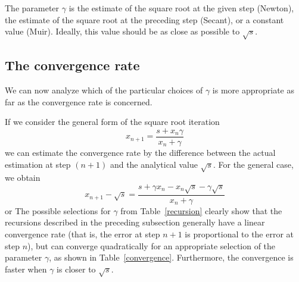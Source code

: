 \begin {enumerate}
The parameter $\gamma$ is the estimate of the square root at the given
step (Newton), the estimate of the square root at the preceding step
(Secant), or a constant value (Muir). Ideally, this value should be as
close as possible to $\sqrt{s}$.
\end{enumerate}

\subsection{The convergence rate}
We can now analyze which of the particular choices of $\gamma$ is more
appropriate as far as the convergence rate is concerned.
\par
If we consider the general form of the square root iteration
\[x_{n+1}=\frac{s+x_{n}\gamma}{x_n+\gamma}\]
we can estimate the convergence rate by the difference between the
actual estimation at step $(n+1)$ and the analytical value
$\sqrt{s}$. For the general case, we obtain
\[ x_{n+1}-\sqrt{s} =
\frac{s+\gamma x_n -x_n \sqrt{s}-\gamma \sqrt{s}}{x_n+\gamma}\]
or
\beq \label{convergence}
 \eeq
The possible selections for $\gamma$ from Table~\ref{recursion} 
clearly show that the recursions
described in the preceding subsection generally have a linear
convergence rate (that is, the error at step $n+1$ is proportional to
the error at step $n$), but can converge quadratically for an
appropriate selection of the parameter $\gamma$, as shown in 
Table~\ref{convergence}. Furthermore, the convergence is faster
when $\gamma$ is closer to $\sqrt{s}$.

